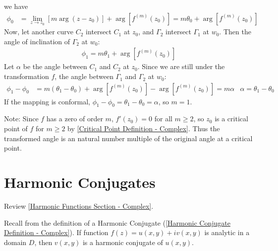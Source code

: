 \documentclass[12pt, english]{book}
\begin{document}
\begin{example}
{		we have
		\begin{align*}
			\phi_0 
			&= \lim_{z \rightarrow z_0} [m \arg(z-z_0)] + \arg[f^{(m)}(z_0)] 
			 = m\theta_0 + \arg[f^{(m)}(z_0)] 
		\end{align*}	
		Now, let another curve \(C_2\) intersect \(C_1\) at \(z_0\), and \(\Gamma_2\) intersect \(\Gamma_1\) at \(w_0\). Then the angle of inclination of \(\Gamma_2\) at \(w_0\): 
		\begin{align*}
			\phi_1 = m \theta_1 + \arg[f^{(m)}(z_0)]
		\end{align*}
		Let \(\alpha\) be the angle between \(C_1\) and \(C_2\) at \(z_0\). Since we are still under the transformation \(f\), the angle between \(\Gamma_1\) and \(\Gamma_2\) at \(w_0\):
		\begin{align*}
			\phi_1 - \phi_0 
			&= m(\theta_1 - \theta_0) + \arg[f^{(m)}(z_0)] - \arg[f^{(m)}(z_0)]  = m\alpha
				& \alpha = \theta_1 - \theta_0
		\end{align*}
		If the mapping is conformal, \(\phi_1 - \phi_0 = \theta_1 - \theta_0 = \alpha\), so \(m = 1\).
		
		Note: Since \(f\) has a zero of order \(m\), \(f'(z_0) = 0\) for all \(m \geq 2\), so \(z_0\) is a critical point of \(f\) for \(m \geq 2\) by \cref{Critical Point Definition - Complex}. Thus the transformed angle is an natural number multiple of the original angle at a critical point.
		}
	\end{example}
	
	\section{Harmonic Conjugates} \label{Harmonic Conjugates Section - Complex}
	 
	
	Review \cref{Harmonic Functions Section - Complex}.
	
	Recall from the definition of a Harmonic Conjugate (\cref{Harmonic Conjugate Definition - Complex}). If function \(f(z) = u(x,y) + iv(x,y)\) is analytic in a domain \(D\), then \(v(x,y)\) is a harmonic conjugate of \(u(x,y)\). \newline
	
\end{document}
